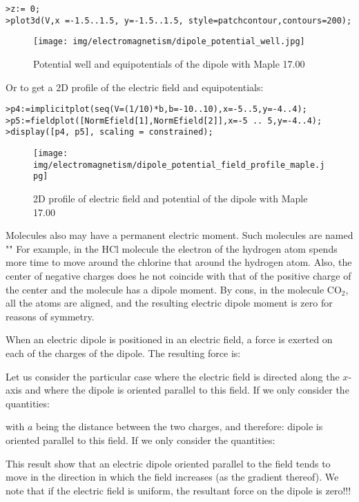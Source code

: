 	\texttt{>z:= 0;\\
	>plot3d(V,x =-1.5..1.5, y=-1.5..1.5, style=patchcontour,contours=200);
	}

	\begin{figure}[H]
		\centering
		\texttt{[image: img/electromagnetism/dipole\_potential\_well.jpg]}
		\caption{Potential well and equipotentials of the dipole with Maple 17.00}
	\end{figure}
	Or to get a 2D profile of the electric field and equipotentials:
	
	\texttt{>p4:=implicitplot({seq(V=(1/10)*b,b=-10..10)},x=-5..5,y=-4..4);\\
	>p5:=fieldplot([NormEfield[1],NormEfield[2]],x=-5 .. 5,y=-4..4); 
	\\>display([p4, p5], scaling = constrained);\\
	}
	\begin{figure}[H]
		\centering
		\texttt{[image: img/electromagnetism/dipole\_potential\_field\_profile\_maple.jpg]}
		\caption{2D profile of electric field and potential of the dipole with Maple 17.00}
	\end{figure}
	\begin{tcolorbox}[title=Remark,colframe=black,arc=10pt]
	Molecules also may have a permanent electric moment. Such molecules are named "" For example, in the HCl molecule the electron of the hydrogen atom spends more time to move around the chlorine that around the hydrogen atom. Also, the center of negative charges does he not coincide with that of the positive charge of the center and the molecule has a dipole moment. By cons, in the molecule $\text{CO}_2$, all the atoms are aligned, and the resulting electric dipole moment is zero for reasons of symmetry.
	\end{tcolorbox}
	When an electric dipole is positioned in an electric field, a force is exerted on each of the charges of the dipole. The resulting force is:
	
	Let us consider the particular case where the electric field is directed along the $x$-axis and where the dipole is oriented parallel to this field. If we only consider the quantities:
	
	with $a$ being the distance between the two charges, and therefore:
	dipole is oriented parallel to this field. If we only consider the quantities:
	
	This result show that an electric dipole oriented parallel to the field tends to move in the direction in which the field increases (as the gradient thereof). We note that if the electric field is uniform, the resultant force on the dipole is zero!!!
	
